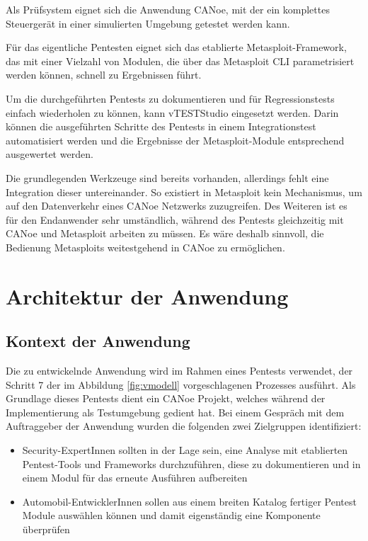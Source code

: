 Als Prüfsystem eignet sich die Anwendung CANoe, mit der ein komplettes Steuergerät in einer simulierten Umgebung getestet werden kann. 

Für das eigentliche Pentesten eignet sich das etablierte Metasploit-Framework, das mit einer Vielzahl von Modulen, die über das Metasploit CLI parametrisiert werden können, schnell zu Ergebnissen führt.

Um die durchgeführten Pentests zu dokumentieren und für Regressionstests einfach wiederholen zu können, kann vTESTStudio eingesetzt werden. Darin können die ausgeführten Schritte des Pentests in einem Integrationstest automatisiert werden und die Ergebnisse der Metasploit-Module entsprechend ausgewertet werden.

Die grundlegenden Werkzeuge sind bereits vorhanden, allerdings fehlt eine Integration dieser untereinander. So existiert in Metasploit kein Mechanismus, um auf den Datenverkehr eines CANoe Netzwerks zuzugreifen. Des Weiteren ist es für den Endanwender sehr umständlich, während des Pentests gleichzeitig mit CANoe und Metasploit arbeiten zu müssen. Es wäre deshalb sinnvoll, die Bedienung Metasploits weitestgehend in CANoe zu ermöglichen. 

\section{Architektur der Anwendung}\label{subsec:context}

\subsection{Kontext der Anwendung}\label{subsec:kontext}
Die zu entwickelnde Anwendung wird im Rahmen eines Pentests verwendet, der Schritt 7 der im Abbildung \ref{fig:vmodell} vorgeschlagenen Prozesses ausführt. Als Grundlage dieses Pentests dient ein CANoe Projekt, welches während der Implementierung als Testumgebung gedient hat. Bei einem Gespräch mit dem Auftraggeber der Anwendung wurden die folgenden zwei Zielgruppen identifiziert:

\begin{itemize}
\item Security-ExpertInnen sollten in der Lage sein, eine Analyse mit etablierten Pentest-Tools und Frameworks durchzuführen, diese zu dokumentieren und in einem Modul für das erneute Ausführen aufbereiten
\item Automobil-EntwicklerInnen sollen aus einem breiten Katalog fertiger Pentest Module auswählen können und damit eigenständig eine Komponente überprüfen
\end{itemize}

